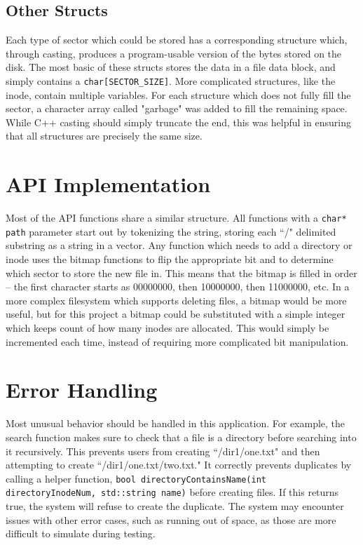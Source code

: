 \documentclass[]{article}
\begin{document}
\subsection{Other Structs}
Each type of sector which could be stored has a corresponding structure which, through casting, produces a program-usable version of the bytes stored on the disk. The most basic of these structs stores the data in a file data block, and simply contains a \texttt{char[SECTOR\_SIZE]}. More complicated structures, like the inode, contain multiple variables. For each structure which does not fully fill the sector, a character array called "garbage" was added to fill the remaining space. While C++ casting should simply truncate the end, this was helpful in ensuring that all structures are precisely the same size.

\section{API Implementation}
Most of the API functions share a similar structure. All functions with a \texttt{char* path} parameter start out by tokenizing the string, storing each ``/" delimited substring as a string in a vector. Any function which needs to add a directory or inode uses the bitmap functions to flip the appropriate bit and to determine which sector to store the new file in. This means that the bitmap is filled in order -- the first character starts as 00000000, then 10000000, then 11000000, etc. In a more complex filesystem which supports deleting files, a bitmap would be more useful, but for this project a bitmap could be substituted with a simple integer which keeps count of how many inodes are allocated. This would simply be incremented each time, instead of requiring more complicated bit manipulation.

\section{Error Handling}
Most unusual behavior should be handled in this application. For example, the search function makes sure to check that a file is a directory before searching into it recursively. This prevents users from creating ``/dir1/one.txt" and then attempting to create ``/dir1/one.txt/two.txt." It correctly prevents duplicates by calling a helper function, \texttt{bool directoryContainsName(int directoryInodeNum, std::string name)} before creating files. If this returns true, the system will refuse to create the duplicate. The system may encounter issues with other error cases, such as running out of space, as those are more difficult to simulate during testing.
\end{document}
